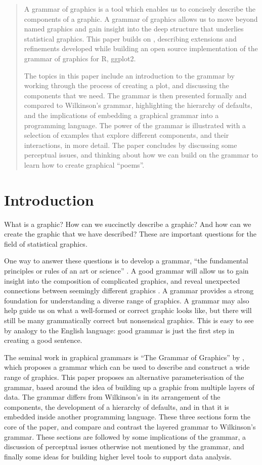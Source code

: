 \begin{abstract}
  A grammar of graphics is a tool which enables us to concisely describe the components of a graphic.  A grammar of graphics allows us to move beyond named graphics and gain insight into the deep structure that underlies statistical graphics. This paper builds on \citet{wilkinson:2006}, describing extensions and refinements developed while building an open source implementation of the grammar of graphics for R, ggplot2.  
  
  The topics in this paper include an introduction to the grammar by working through the process of creating a plot, and discussing the components that we need.  The grammar is then presented formally and compared to Wilkinson's grammar, highlighting the hierarchy of defaults, and the implications of embedding a graphical grammar into a programming language.  The power of the grammar is illustrated with a selection of examples that explore different components, and their interactions, in more detail.  The paper concludes by discussing some perceptual issues, and thinking about how we can build on the grammar to learn how to create graphical ``poems''.
\end{abstract}

\section{Introduction}\label{sec:introduction}

What is a graphic? How can we succinctly describe a graphic? And how can we create the graphic that we have described?  These are important questions for the field of statistical graphics.

One way to answer these questions is to develop a grammar, ``the fundamental principles or rules of an art or science'' \citep{grammar}.   A good grammar will allow us to gain insight into the composition of complicated graphics, and reveal unexpected connections between seemingly different graphics \citep{cox:1978}.  A grammar provides a strong foundation for understanding a diverse range of graphics.  A grammar may also help guide us on what a well-formed or correct graphic looks like, but there will still be many grammatically correct but nonsensical graphics.  This is easy to see by analogy to the English language: good grammar is just the first step in creating a good sentence. 

The seminal work in graphical grammars is ``The Grammar of Graphics'' by \citet{wilkinson:2005}, which proposes a grammar which can be used to describe and construct a wide range of graphics.  This paper proposes an alternative parameterisation of the grammar, based around the idea of building up a graphic from multiple layers of data.  The grammar differs from Wilkinson's in its arrangement of the components, the development of a hierarchy of defaults, and in that it is embedded inside another programming language.  These three sections form the core of the paper, and compare and contrast the layered grammar to Wilkinson's grammar.  These sections are followed by some implications of the grammar, a discussion of perceptual issues otherwise not mentioned by the grammar, and finally some ideas for building higher level tools to support data analysis.

